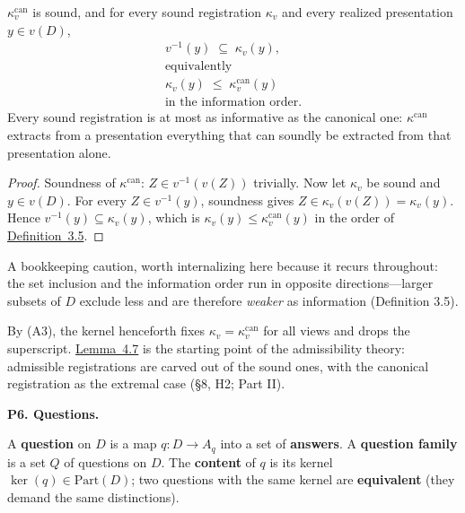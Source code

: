 \begin{thmplain}

\(\kappa^{\mathrm{can}}_v\) is sound, and for every sound registration \(\kappa_v\) and every realized presentation \(y \in v(D)\),
\[\begin{gathered}v^{-1}(y) \;\subseteq\; \kappa_v(y), \\ \text{equivalently} \\ \kappa_v(y) \;\le\; \kappa^{\mathrm{can}}_v(y) \\ \text{in the information order.}\end{gathered}\]
Every sound registration is at most as informative as the canonical one: \(\kappa^{\mathrm{can}}\) extracts from a presentation everything that can soundly be extracted from that presentation alone.
\end{thmplain}

\begin{proof}

Soundness of \(\kappa^{\mathrm{can}}\): \(Z \in v^{-1}(v(Z))\) trivially. Now let \(\kappa_v\) be sound and \(y \in v(D)\). For every \(Z \in v^{-1}(y)\), soundness gives \(Z \in \kappa_v(v(Z)) = \kappa_v(y)\). Hence \(v^{-1}(y) \subseteq \kappa_v(y)\), which is \(\kappa_v(y) \le \kappa^{\mathrm{can}}_v(y)\) in the order of \hyperlink{stmt:3.5}{Definition~3.5}.
\end{proof}

A bookkeeping caution, worth internalizing here because it recurs throughout: the set inclusion and the information order run in opposite directions---\hspace{0pt}larger subsets of \(D\) exclude less and are therefore \emph{weaker} as information (Definition 3.5).

By (A3), the kernel henceforth fixes \(\kappa_v = \kappa^{\mathrm{can}}_v\) for all views and drops the superscript. \hyperlink{stmt:4.7}{Lemma~4.7} is the starting point of the admissibility theory: admissible registrations are carved out of the sound ones, with the canonical registration as the extremal case (§8, H2; Part II).

\textbf{P6. Questions.}

\begin{thmdef}

A \textbf{question} on \(D\) is a map \(q : D \to A_q\) into a set of \textbf{answers}. A \textbf{question family} is a set \(Q\) of questions on \(D\). The \textbf{content} of \(q\) is its kernel \(\ker(q) \in \mathrm{Part}(D)\); two questions with the same kernel are \textbf{equivalent} (they demand the same distinctions).
\end{thmdef}

